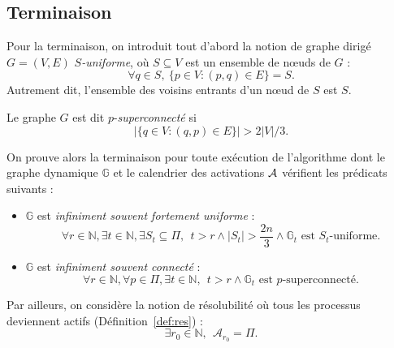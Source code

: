 \documentclass{article}
\begin{document}
\subsection{Terminaison}
 
Pour la terminaison, on introduit tout d'abord la notion de graphe dirig\'e $G=(V,E)$ \emph{$S$-uniforme}, o\`u $S\subseteq V$ est
	un ensemble de n\oe uds de $G$ :
	$$ \forall q \in S, \  \{ p \in V : (p,q) \in E\} = S .$$
Autrement dit, l'ensemble des voisins entrants d'un n\oe ud de $S$ est $S$.

Le graphe $G$ est dit $p$-\emph{superconnect\'e} si 
	$$ | \{ q \in V : (q ,p ) \in E\} | > 2 |V|/3 .$$

On prouve alors la terminaison pour toute exécution de l'algorithme dont le graphe dynamique $ \mathds{G} $ et le calendrier des 
	activations $ {\cal A}$ vérifient  les prédicats suivants :
\begin{itemize}
	\item $\mathds{G}$ est \emph{infiniment souvent  fortement uniforme} :
		$$\forall r \in \mathds{N}, \exists t \in \mathds{N}, \exists S_t \subseteq \Pi, \  \ 
		 t > r  \wedge |S_t | > \frac{2 n}{3} \wedge  \mathds{G}_t \mbox{ est $S_t $-uniforme} .$$
	\item $\mathds{G}$ est \emph{infiniment souvent  connect\'e} :
		$$\forall r \in \mathds{N}, \forall p\in\Pi, \exists t \in \mathds{N}, \  \ 
		 t > r  \wedge \mathds{G}_t \mbox{ est $p$-superconnect\'e} .$$
		\end{itemize}
		
Par ailleurs, on consid\`ere la notion de r\'esolubilit\'e o\`u tous les processus deviennent actifs (D\'efinition~\ref{def:res}) :
	$$\exists r_0 \in \mathds{N}, \ \ \mathcal{A}_{r_0} = \Pi . $$
\end{document}
